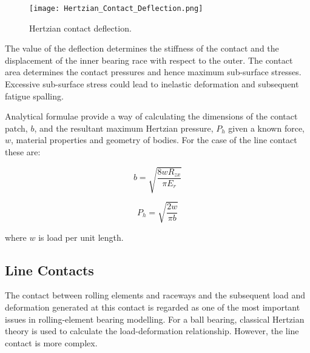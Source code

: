 \begin{figure}
	\centerline{\texttt{[image: Hertzian\_Contact\_Deflection.png]}}
	\caption{Hertzian contact deflection.}
	\label{HertzianContactDeflection}
\end{figure}

The value of the deflection determines the stiffness of the contact and the displacement of the inner bearing race with respect to the outer. The contact area determines the contact pressures and hence maximum sub-surface stresses. Excessive sub-surface stress could lead to inelastic deformation and subsequent fatigue spalling.

Analytical formulae provide a way of calculating the dimensions of the contact patch, $b$, and the resultant maximum Hertzian pressure, $P_h$ given a known force, $w$, material properties and geometry of bodies. For the case of the line contact these are:

\begin{equation}\label{eq2.3}
	b=\sqrt{\frac{8 w R_{z x}}{\pi E_r}}
\end{equation}

\begin{equation}\label{eq2.4}
	P_h=\sqrt{\frac{2 w}{\pi b}}
\end{equation}

where $w$ is load per unit length.

\subsection{Line Contacts}

The contact between rolling elements and raceways and the subsequent load and deformation generated at this contact is regarded as one of the most important issues in rolling-element bearing modelling. For a ball bearing, classical Hertzian theory is used to calculate the load-deformation relationship. However, the line contact is more complex.

